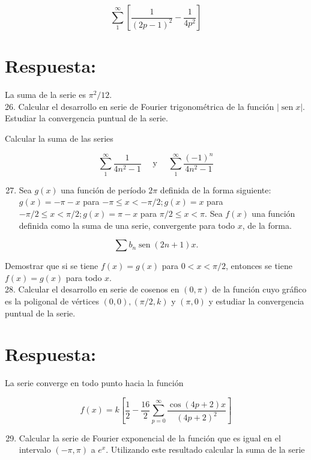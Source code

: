 \documentclass[10pt]{article}
\theoremstyle{plain}
\theoremstyle{definition}
\theoremstyle{remark}
\begin{document}
$$
\sum_{1}^{\infty}\left[\frac{1}{(2 p-1)^{2}}-\frac{1}{4 p^{2}}\right]
$$

\section*{Respuesta:}
La suma de la serie es $\pi^{2} / 12$.\\
26. Calcular el desarrollo en serie de Fourier trigonométrica de la función $|\operatorname{sen} x|$. Estudiar la convergencia puntual de la serie.

Calcular la suma de las series

$$
\sum_{1}^{\infty} \frac{1}{4 n^{2}-1} \quad \text { y } \quad \sum_{1}^{\infty} \frac{(-1)^{n}}{4 n^{2}-1}
$$

\begin{enumerate}
  \setcounter{enumi}{26}
  \item Sea $g(x)$ una función de período $2 \pi$ definida de la forma siguiente: $g(x)=-\pi-x$ para $-\pi \leqslant x<-\pi / 2 ; g(x)=x$ para $-\pi / 2 \leqslant x<\pi / 2 ; g(x)=\pi-x$ para $\pi / 2 \leqslant x<\pi$. Sea $f(x)$ una función definida como la suma de una serie, convergente para todo $x$, de la forma.
\end{enumerate}

$$
\sum b_{n} \operatorname{sen}(2 n+1) x .
$$

Demostrar que si se tiene $f(x)=g(x)$ para $0<x<\pi / 2$, entonces se tiene $f(x)=g(x)$ para todo $x$.\\
28. Calcular el desarrollo en serie de cosenos en $(0, \pi)$ de la función cuyo gráfico es la poligonal de vértices $(0,0),(\pi / 2, k)$ y $(\pi, 0)$ y estudiar la convergencia puntual de la serie.

\section*{Respuesta:}
La serie converge en todo punto hacia la función

$$
f(x)=k\left[\frac{1}{2}-\frac{16}{2} \sum_{p=0}^{\infty} \frac{\cos (4 p+2) x}{(4 p+2)^{2}}\right]
$$

\begin{enumerate}
  \setcounter{enumi}{28}
  \item Calcular la serie de Fourier exponencial de la función que es igual en el intervalo $(-\pi, \pi)$ a $e^{x}$. Utilizando este resultado calcular la suma de la serie
\end{enumerate}
\end{document}

